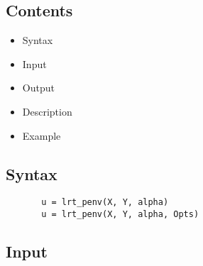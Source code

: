 \documentclass[a4paper,11pt,openany]{memoir}
\begin{document}
\subsection*{Contents}

\begin{itemize}
\setlength{\itemsep}{-1ex}
   \item Syntax
   \item Input
   \item Output
   \item Description
   \item Example
\end{itemize}


\subsection*{Syntax}


\begin{verbatim}       u = lrt_penv(X, Y, alpha)
       u = lrt_penv(X, Y, alpha, Opts)\end{verbatim}
    

\subsection*{Input}
\end{document}
